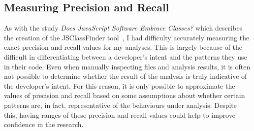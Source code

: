 \subsection{Measuring Precision and Recall}
As with the study \textit{Does JavaScript Software Embrace Classes?} which describes the creation of the JSClassFinder tool~\cite{JSClassFinder}, I had difficulty accurately measuring the exact precision and recall values for my analyses. This is largely because of the difficult in differentiating between a developer's intent and the patterns they use in their code. Even when manually inspecting files and analysis results, it is often not possible to determine whether the result of the analysis is truly indicative of the developer's intent. For this reason, it is only possible to approximate the values of precision and recall based on some assumptions about whether certain patterns are, in fact, representative of the behaviours under analysis. Despite this, having ranges of these precision and recall values could help to improve confidence in the research.